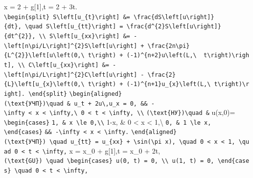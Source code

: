 \documentclass[
  ukrainian,
]{article}
\begin{document}
x = 2 + g{[}1{]},t = 2 + 3t.
\texttt{\textbackslash{}begin\{split\}\ S\textbackslash{}left{[}u\_\{t\}\textbackslash{}right{]}\ \&=\ \textbackslash{}frac\{dS\textbackslash{}left{[}u\textbackslash{}right{]}\}\{dt\},\ \textbackslash{}quad\ S\textbackslash{}left{[}u\_\{tt\}\textbackslash{}right{]}\ =\ \textbackslash{}frac\{d\^{}\{2\}S\textbackslash{}left{[}u\textbackslash{}right{]}\}\{dt\^{}\{2\}\},\ \textbackslash{}\textbackslash{}\ S\textbackslash{}left{[}u\_\{xx\}\textbackslash{}right{]}\ \&=\ -\textbackslash{}left{[}n\textbackslash{}pi/L\textbackslash{}right{]}\^{}\{2\}S\textbackslash{}left{[}u\textbackslash{}right{]}\ +\ \textbackslash{}frac\{2n\textbackslash{}pi\}\{L\^{}\{2\}\}\textbackslash{}left{[}u\textbackslash{}left(0,\textbackslash{}\ t\textbackslash{}right)\ +\ (-1)\^{}\{n+2\}u\textbackslash{}left(L,\textbackslash{}\ \ t\textbackslash{}right)\textbackslash{}right{]},\ \textbackslash{}\textbackslash{}\ C\textbackslash{}left{[}u\_\{xx\}\textbackslash{}right{]}\ \&=\ -\textbackslash{}left{[}n\textbackslash{}pi/L\textbackslash{}right{]}\^{}\{2\}C\textbackslash{}left{[}u\textbackslash{}right{]}\ -\ \textbackslash{}frac\{2\}\{L\}\textbackslash{}left{[}u\_\{x\}\textbackslash{}left(0,\textbackslash{}\ t\textbackslash{}right)\ +\ (-1)\^{}\{n+1\}u\_\{x\}\textbackslash{}left(L,\textbackslash{}\ t\textbackslash{}right)\textbackslash{}right{]}.\ \textbackslash{}end\{split\}}
\texttt{\textbackslash{}begin\{aligned\}}
\texttt{(\textbackslash{}text\{УЧП\})\textbackslash{}quad\ \&\ u\_t\ +\ 2u\textbackslash{},u\_x\ =\ 0,\ \&\&\ -\textbackslash{}infty\ \textless{}\ x\ \textless{}\ \textbackslash{}infty,\textbackslash{}\ 0\ \textless{}\ t\ \textless{}\ \textbackslash{}infty,\ \textbackslash{}\textbackslash{}}
\texttt{(\textbackslash{}text\{НУ\})\textbackslash{}quad\ \&} u(x,0)=
\texttt{\textbackslash{}begin\{cases\}}
\texttt{1,\ \&\ x\ \textbackslash{}le\ 0,\textbackslash{}\textbackslash{}}
1-x, \& 0 \textless{} x \textless{} 1,\textbackslash{}
\texttt{0,\ \&\ 1\ \textbackslash{}le\ x,}
\texttt{\textbackslash{}end\{cases\}}
\texttt{\&\&\ -\textbackslash{}infty\ \textless{}\ x\ \textless{}\ \textbackslash{}infty.}
\texttt{\textbackslash{}end\{aligned\}}
\texttt{(\textbackslash{}text\{УЧП\})\ \textbackslash{}quad\ u\_\{tt\}\ =\ u\_\{xx\}\ +\ \textbackslash{}sin(\textbackslash{}pi\ x),\ \textbackslash{}quad\ 0\ \textless{}\ x\ \textless{}\ 1,\ \textbackslash{}quad\ 0\ \textless{}\ t\ \textless{}\ \textbackslash{}infty,}
x = x\_0 + g{[}1{]},t = x\_0 + 2t,
\texttt{(\textbackslash{}text\{GU\})\ \textbackslash{}quad\ \textbackslash{}begin\{cases\}\ u(0,\ t)\ =\ 0,\ \textbackslash{}\textbackslash{}\ u(1,\ t)\ =\ 0,\ \textbackslash{}end\{cases\}\ \textbackslash{}quad\ 0\ \textless{}\ t\ \textless{}\ \textbackslash{}infty,}
\end{document}
